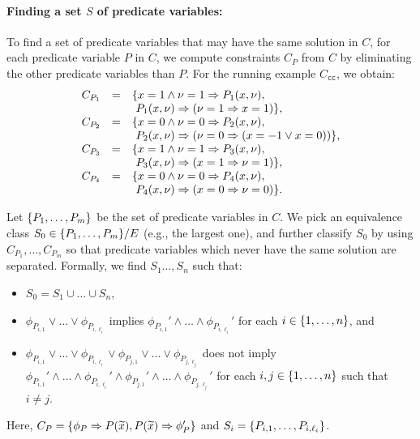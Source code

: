 \paragraph{Finding a set \(S\) of predicate variables:}
To find a set of predicate variables that may have the same solution in
\(C\), for each predicate variable \(P\) in \(C\), we compute
constraints \(C_P\) from \(C\) by eliminating the other predicate
variables than \(P\).
%
For the running example \(C_{\texttt{cc}}\), we obtain:
\[
\begin{array}{rcl}
C_{P_1}&=&\{x=1 \land \nu=1 \Rightarrow P_1(x,\nu), \\
&&\ P_1(x,\nu) \Rightarrow (\nu=1 \Rightarrow x=1)\}, \\
C_{P_2}&=&\{x=0 \land \nu=0 \Rightarrow P_2(x,\nu), \\
&&\ P_2(x,\nu) \Rightarrow (\nu=0 \Rightarrow (x=-1 \lor x=0))\}, \\
C_{P_3}&=&\{x=1 \land \nu=1 \Rightarrow P_3(x,\nu), \\
&&\ P_3(x,\nu) \Rightarrow (x=1 \Rightarrow \nu=1)\}, \\
C_{P_4}&=&\{x=0 \land \nu=0 \Rightarrow P_4(x,\nu), \\
&&\ P_4(x,\nu) \Rightarrow (x=0 \Rightarrow \nu=0)\}.
\end{array}
\]


Let \(\{{P_1,\dots,P_m}\}\) be the set of predicate variables in \(C\).
We pick an equivalence class \(S_0 \in \{{P_1,\dots,P_m}\} / E\) (e.g.,
the largest one), and further classify \(S_0\) by using
\(C_{P_1},\dots,C_{P_m}\) so that predicate variables which never have
the same solution are separated.
%
Formally, we find \(S_1\dots,S_n\) such that:
\begin{itemize}
\item \(S_0 = S_1 \cup \dots \cup S_n\),
\item \(\phi_{P_{i,1}} \lor \dots \lor\phi_{P_{i,\ell_i}}\) implies
\(\phi_{P_{i,1}}' \land \dots \land\phi_{P_{i,\ell_i}}'\) for each \(i
\in \{{1,\dots,n}\}\), and
\item \(\phi_{P_{i,1}} \lor \dots \lor\phi_{P_{i,\ell_i}} \lor
\phi_{P_{j,1}} \lor \dots \lor\phi_{P_{j,\ell_j}}\) does not imply
\(\phi_{P_{i,1}}' \land \dots \land\phi_{P_{i,\ell_i}}' \land
\phi_{P_{j,1}}' \land \dots \land\phi_{P_{j,\ell_j}}'\) for each \(i,j
\in \{{1,\dots,n}\}\) such that \(i \neq j\).
\end{itemize}
Here, \(C_{P}=\{{\phi_{P} \Rightarrow P(\widetilde{x}),P(\widetilde{x}) \Rightarrow
\phi_{P}'}\}\) and \(S_i=\{{P_{i,1},\dots,P_{i,\ell_i}}\}\).


